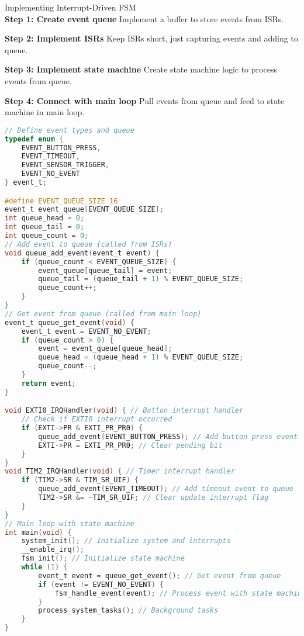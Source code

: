 \begin{KR}{Implementing Interrupt-Driven FSM}\\
\textbf{Step 1: Create event queue}
Implement a buffer to store events from ISRs.

\textbf{Step 2: Implement ISRs}
Keep ISRs short, just capturing events and adding to queue.

\textbf{Step 3: Implement state machine}
Create state machine logic to process events from queue.

\textbf{Step 4: Connect with main loop}
Pull events from queue and feed to state machine in main loop.

\begin{lstlisting}[language=C, style=basesmol]
// Define event types and queue
typedef enum {
    EVENT_BUTTON_PRESS,
    EVENT_TIMEOUT,
    EVENT_SENSOR_TRIGGER,
    EVENT_NO_EVENT
} event_t;

#define EVENT_QUEUE_SIZE 16
event_t event_queue[EVENT_QUEUE_SIZE];
int queue_head = 0;
int queue_tail = 0;
int queue_count = 0;
// Add event to queue (called from ISRs)
void queue_add_event(event_t event) { 
    if (queue_count < EVENT_QUEUE_SIZE) {
        event_queue[queue_tail] = event;
        queue_tail = (queue_tail + 1) % EVENT_QUEUE_SIZE;
        queue_count++;
    }
}
// Get event from queue (called from main loop)
event_t queue_get_event(void) { 
    event_t event = EVENT_NO_EVENT;
    if (queue_count > 0) {
        event = event_queue[queue_head];
        queue_head = (queue_head + 1) % EVENT_QUEUE_SIZE;
        queue_count--;
    }
    return event;
}

void EXTI0_IRQHandler(void) { // Button interrupt handler
    // Check if EXTI0 interrupt occurred
    if (EXTI->PR & EXTI_PR_PR0) {
        queue_add_event(EVENT_BUTTON_PRESS); // Add button press event to queue
        EXTI->PR = EXTI_PR_PR0; // Clear pending bit
    }
}
void TIM2_IRQHandler(void) { // Timer interrupt handler
    if (TIM2->SR & TIM_SR_UIF) {
        queue_add_event(EVENT_TIMEOUT); // Add timeout event to queue
        TIM2->SR &= ~TIM_SR_UIF; // Clear update interrupt flag
    }
}
// Main loop with state machine
int main(void) {
    system_init(); // Initialize system and interrupts
    __enable_irq();
    fsm_init(); // Initialize state machine
    while (1) {
        event_t event = queue_get_event(); // Get event from queue
        if (event != EVENT_NO_EVENT) { 
            fsm_handle_event(event); // Process event with state machine
        }
        process_system_tasks(); // Background tasks
    }
}
\end{lstlisting}
\end{KR}




